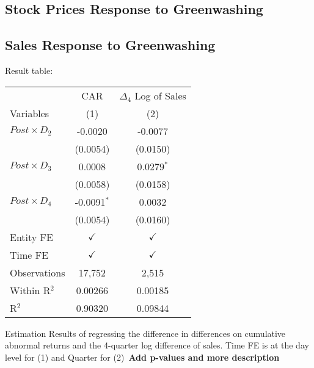 \documentclass[12pt]{article}
\begin{document}
\subsection{Stock Prices Response to Greenwashing}
\subsection{Sales Response to Greenwashing}

Result table:

\begin{table}
    
    
    \centering
    \begin{tabular}{lcc}
        \toprule
        \toprule
                                    & CAR           & $\Delta_4$ Log of Sales \\
        Variables                   & (1)           & (2)\\
        \midrule
        $Post \times D_2$           & -0.0020       & -0.0077\\
                                    & (0.0054)      & (0.0150)\\
        $Post \times D_3$           & 0.0008        & 0.0279$^{*}$\\
                                    & (0.0058)      & (0.0158)\\
        $Post \times D_4$           & -0.0091$^{*}$ & 0.0032\\
                                    & (0.0054)      & (0.0160)\\
        Entity FE                   & $\checkmark$  & $\checkmark$\\
        Time FE                     & $\checkmark$  & $\checkmark$\\
        Observations                & 17,752        & 2,515\\
        Within R$^2$                & 0.00266       & 0.00185\\
        R$^2$                       & 0.90320       & 0.09844\\  
        \bottomrule
    \end{tabular}
    
    \begin{tablenotes}
        \footnotesize
    \item Estimation Results of regressing the difference in differences on cumulative abnormal returns and the 4-quarter log difference of sales. Time FE is at the day level for (1) and Quarter for (2)\ \textbf{Add p-values and more description}
    \end{tablenotes}
\end{table}
\end{document}
